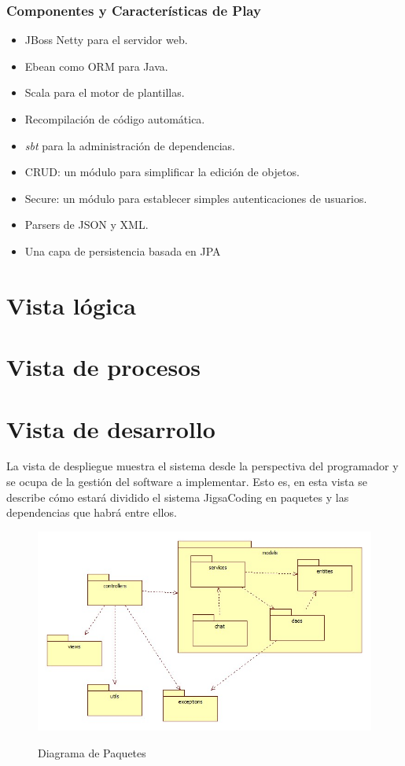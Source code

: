 \subsubsection{Componentes y Características de Play}
\begin{itemize}
  \item JBoss Netty para el servidor web.
  \item Ebean como ORM para Java.
  \item Scala para el motor de plantillas.
  \item Recompilación de código automática.
  \item \emph{sbt} para la administración de dependencias.
  \item CRUD: un módulo para simplificar la edición de objetos.
  \item Secure: un módulo para establecer simples autenticaciones de usuarios.
  \item Parsers de JSON y XML.
  \item Una capa de persistencia basada en JPA
\end{itemize}
\clearpage
\section{Vista lógica}
\clearpage
\section{Vista de procesos}
\clearpage
\section{Vista de desarrollo}
La vista de despliegue muestra el sistema desde la perspectiva del programador y se ocupa de la gestión del software a implementar. Esto es, en esta vista se describe cómo estará dividido el sistema JigsaCoding en paquetes y las dependencias que habrá entre ellos.
\begin{figure}[!h]
  \centering
  \includegraphics[scale=0.6]{figuras/sad/diagrama_de_paquetes.jpg}\\
  \caption{Diagrama de Paquetes}\label{fig:diagrama_de_paquetes}
\end{figure}
\clearpage
